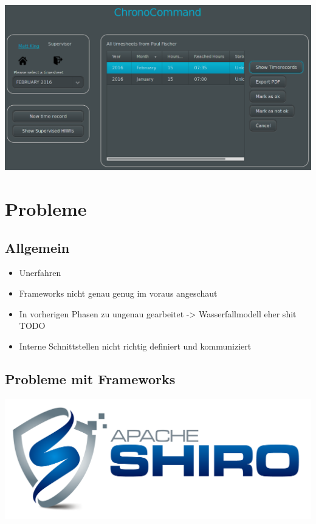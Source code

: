 \begin{frame}
	\begin{center}
		\includegraphics[width=\linewidth,height=0.9\textheight,keepaspectratio]{images/timesheets-overview.png}
	\end{center}
\end{frame}


\section{Probleme}

\subsection{Allgemein}
\begin{frame}
	\begin{itemize}
		\item Unerfahren
		\item Frameworks nicht genau genug im voraus angeschaut
		\item In vorherigen Phasen zu ungenau gearbeitet
		-> Wasserfallmodell eher shit TODO
		\item Interne Schnittstellen nicht richtig definiert und kommuniziert
	\end{itemize}
\end{frame}

\subsection{Probleme mit Frameworks}

\begin{frame}
	\includegraphics[width=\linewidth]{images/shiro-logo.png}
\end{frame}

